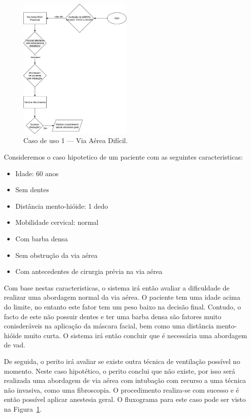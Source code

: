\documentclass[a4paper,12pt,twoside]{article}
\begin{document}
    \begin{figure}[H]
        \centering
        \includegraphics[width=0.5\textwidth]{./resources/pdf/casoDeUso1.jpg}
        \caption{Caso de uso 1 --- Via Aérea Difícil.}
        \label{fig:caso1}
    \end{figure}

    Consideremos o caso hipotetico de um paciente com as seguintes caracteristicas:
    \begin{itemize}
        \setlength{\itemsep}{2pt} 
        \setlength{\parskip}{0pt} 
        \setlength{\parsep}{0pt} 
        \item Idade: 60 anos
        \item Sem dentes
        \item Distância mento-hióide: 1 dedo
        \item Mobilidade cervical: normal
        \item Com barba densa
        \item Sem obstrução da via aérea
        \item Com antecedentes de cirurgia prévia na via aérea
    \end{itemize}

    Com base nestas caracteristicas, o sistema irá então avaliar a dificuldade de realizar uma abordagem normal da via aérea. O paciente tem uma idade acima do limite, no entanto este fator tem um peso baixo na decisão final. Contudo, o facto de este não possuir dentes e ter uma barba densa são fatores muito conisderáveis na aplicação da máscara facial, bem como uma distância mento-hióide muito curta. O sistema irá então concluir que é necessária uma abordagem de \gls{vad}.
    
    De seguida, o perito irá avaliar se existe outra técnica de ventilação possível no momento. Neste caso hipotético, o perito conclui que não existe, por isso será realizada uma abordagem de via aérea com intubação com recurso a uma técnica não invasiva, como uma \gls{fibroscopia}. O procedimento realiza-se com sucesso e é então possível aplicar anestesia geral. O fluxograma para este caso pode ser visto na Figura~\ref{fig:caso1}.
\end{document}
